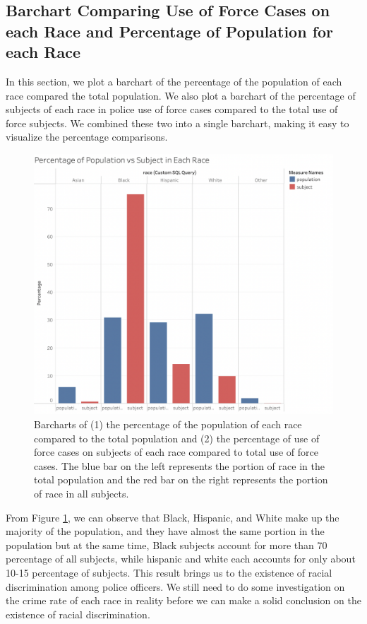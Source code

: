 \documentclass[10pt]{article}
\begin{document}
\subsection{Barchart Comparing Use of Force Cases on each Race and Percentage of Population for each Race}

In this section, we plot a barchart of the percentage of the population of each race compared the total population. We also plot a barchart of the percentage of subjects of each race in police use of force cases compared to the total use of force subjects. We combined these two into a single barchart, making it easy to visualize the percentage comparisons.

\begin{figure}[h]
\centering
\includegraphics[scale=0.44]{image5.png}
\caption{Barcharts of (1) the percentage of the population of each race compared to the total population and (2) the percentage of use of force cases on subjects of each race compared to total use of force cases. The blue bar on the left represents the portion of race in the total population and the red bar on the right represents the portion of race in all subjects.}
\label{fig:population}
\end{figure}


From Figure \ref{fig:population}, we can observe that Black, Hispanic, and White make up the majority of the population, and they have almost the same portion in the population but at the same time, Black subjects account for more than 70 percentage of all subjects, while hispanic and white each accounts for only about 10-15 percentage of subjects. This result brings us to the existence of racial discrimination among police officers. We still need to do some investigation on the crime rate of each race in reality before we can make a solid conclusion on the existence of racial discrimination.
\end{document}
